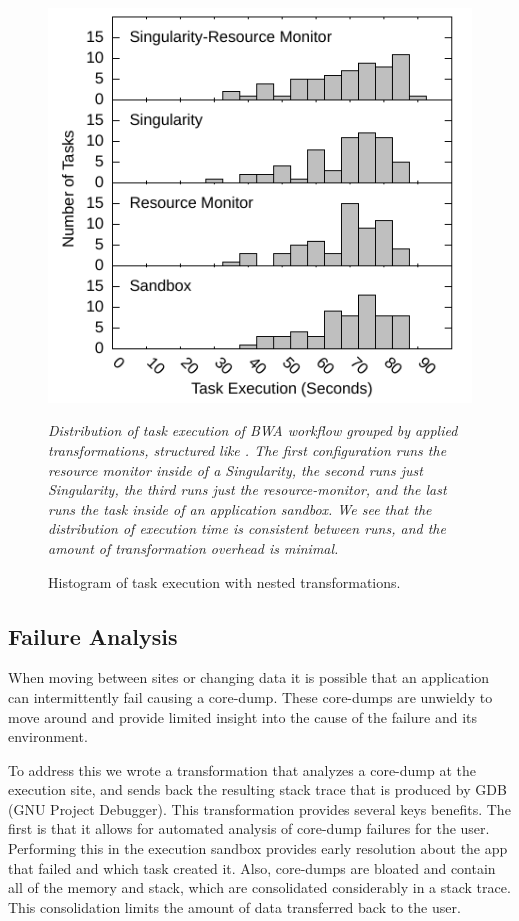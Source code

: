\documentclass[conference]{IEEEtran}
\begin{document}
\begin{figure}[h]
\includegraphics[width=\columnwidth]{graphics/divide_hist.pdf}
\caption{Histogram of task execution with nested transformations.}
\small
\emph{Distribution of task execution of BWA workflow
grouped by applied transformations, 
structured like . 
The first configuration runs the resource monitor inside of
a Singularity, the second runs just Singularity,
the third runs just the resource-monitor, and the last
runs the task inside of an application sandbox.
We see that the distribution of execution
time is consistent between runs, and the amount of 
transformation overhead is minimal.
}
\label{figure:nest-task}
\end{figure}



\subsection{Failure Analysis}

When moving between sites or changing data
it is possible that an application can intermittently
fail causing a core-dump.
These core-dumps are unwieldy to move around and 
provide limited insight into the cause of the failure
and its environment. 

To address this we wrote a transformation that analyzes 
a core-dump at the execution site, and sends back the
resulting stack trace that is produced by GDB (GNU Project Debugger).
This transformation provides several keys benefits.
The first is that it allows for automated analysis of
core-dump failures for the user. Performing this in the 
execution sandbox provides early resolution about the
app that failed and which task created it.
Also, core-dumps are bloated and 
contain all of the memory and stack,
which are consolidated considerably in
a stack trace. 
This consolidation limits the amount of data 
transferred back to the user. 
\end{document}
